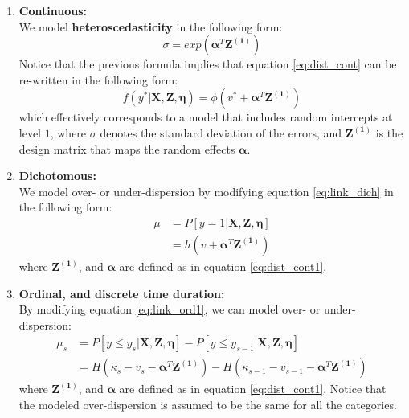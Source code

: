\begin{enumerate}
	\item \textbf{Continuous:} \\
	We model \textbf{heteroscedasticity} in the following form:
	\begin{equation} \label{eq:het_cont}
		\sigma = exp(\pmb{\alpha}^{T}\mathbf{Z^{(1)}})
	\end{equation}
	Notice that the previous formula implies that equation \ref{eq:dist_cont} can be re-written in the following form:
	\begin{equation} \label{eq:dist_cont1}
			f(y^{*}| \mathbf{X}, \mathbf{Z}, \pmb{\eta}) = \phi(v^{*} + \pmb{\alpha}^{T}\mathbf{Z^{(1)}})
	\end{equation}
	which effectively corresponds to a model that includes random intercepts at level $1$, where $\sigma$ denotes the standard deviation of the errors, and $\mathbf{Z^{(1)}}$ is the design matrix that maps the random effects $\pmb{\alpha}$.
	
	
	
	\item \textbf{Dichotomous:} \\
	We model over- or under-dispersion by modifying equation \ref{eq:link_dich} in the following form:
	\begin{equation} \label{eq:link_dich1}
		\begin{split}
			\mu &= P[y=1 | \mathbf{X}, \mathbf{Z}, \pmb{\eta}] \\
			&= h(v + \pmb{\alpha}^{T}\mathbf{Z^{(1)}})
		\end{split}	
	\end{equation}
	where $\mathbf{Z^{(1)}}$, and $\pmb{\alpha}$ are defined as in equation \ref{eq:dist_cont1}.
	
	
	
	\item \textbf{Ordinal, and discrete time duration:} \\
	By modifying equation \ref{eq:link_ord1}, we can model over- or under-dispersion:
	\begin{equation} \label{eq:link_ord3}
		\begin{split}
			\mu_{s} &= P[y \leq y_{s} | \mathbf{X}, \mathbf{Z}, \pmb{\eta}] - P[y \leq y_{s-1} | \mathbf{X}, \mathbf{Z}, \pmb{\eta}] \\
			&= H(\kappa_{s} - v_{s} - \pmb{\alpha}^{T}\mathbf{Z^{(1)}}) - H(\kappa_{s-1} - v_{s-1} - \pmb{\alpha}^{T}\mathbf{Z^{(1)}})
		\end{split}
	\end{equation}
	where $\mathbf{Z^{(1)}}$, and $\pmb{\alpha}$ are defined as in equation \ref{eq:dist_cont1}. Notice that the modeled over-dispersion is assumed to be the same for all the categories.



\end{enumerate}
